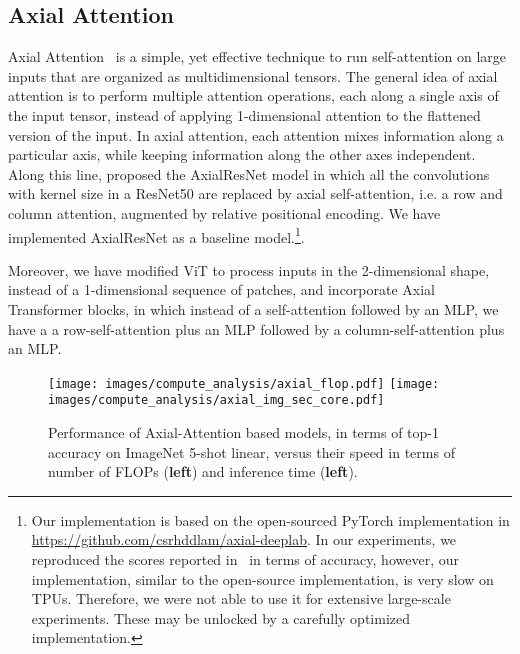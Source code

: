 \documentclass{article} \usepackage{iclr2021_conference,times}
\newcommand{\oursabbrv}{ViT\xspace}
\begin{document}
\subsection{Axial Attention}
Axial Attention~\citep{huang2020ccnet,ho2019-axialattention} is a simple, yet effective technique to run self-attention on large inputs that are organized as multidimensional tensors. The general idea of axial attention is to perform multiple attention operations, each along a single axis of the input tensor, instead of applying 1-dimensional attention to the flattened version of the input. In axial attention, each attention mixes information along a particular axis, while keeping information along the other axes independent. 
Along this line, \citet{wang2020axial} proposed the AxialResNet model in which all the convolutions with kernel size  in a ResNet50 are replaced by axial self-attention, i.e. a row and column attention, augmented by relative positional encoding. 
We have implemented AxialResNet as a baseline model.\footnote{Our implementation is based on the open-sourced PyTorch implementation in \url{https://github.com/csrhddlam/axial-deeplab}. In our experiments, we reproduced the scores reported in~\citep{wang2020axial} in terms of accuracy, however, our implementation, similar to the open-source implementation, is very slow on TPUs.
Therefore, we were not able to use it for extensive large-scale experiments.
These may be unlocked by a carefully optimized implementation.}.

Moreover, we have modified \oursabbrv to process inputs in the 2-dimensional shape, instead of a 1-dimensional sequence of patches, and incorporate Axial Transformer blocks, in which instead of a self-attention followed by an MLP, we have a a row-self-attention plus an MLP followed by a column-self-attention plus an MLP. 
\begin{figure}[h]
    \centering
    \texttt{[image: images/compute\_analysis/axial\_flop.pdf]}
    \hspace{10pt}
    \texttt{[image: images/compute\_analysis/axial\_img\_sec\_core.pdf]}
    \caption{Performance of Axial-Attention based models, in terms of top-1 accuracy on ImageNet 5-shot linear, versus their speed in terms of number of FLOPs (\textbf{left}) and inference time (\textbf{left}).}
    \label{fig:axial_compute_performance}
\end{figure}
\end{document}
